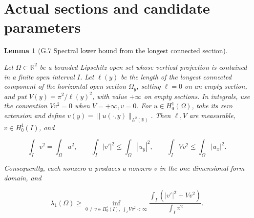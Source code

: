 \documentclass[11pt,a4paper]{article}
\theoremstyle{proofmanuscript}
\newtheorem{lemma}[theorem]{Lemma}
\begin{document}
\section{Actual sections and candidate parameters}

\begin{lemma}[G.7 Spectral lower bound from the longest connected section]\label{lem-largest-section}

Let \(\Omega\subset\mathbb R^2\) be a bounded Lipschitz open set whose vertical projection is contained in a finite open interval \(I\). Let \(\ell(y)\) be the length of the longest connected component of the horizontal open section \(\Omega_y\), setting \(\ell=0\) on an empty section, and put \(V(y)=\pi^2/\ell(y)^2\), with value \(+\infty\) on empty sections. In integrals, use the convention \(Vv^2=0\) when \(V=+\infty,v=0\). For \(u\in H_0^1(\Omega)\), take its zero extension and define \(v(y)=\|u(\cdot,y)\|_{L^2(\mathbb R)}\). Then \(\ell,V\) are measurable, \(v\in H_0^1(I)\), and

\[
\int_I v^2=\int_\Omega u^2,\qquad
\int_I |v'|^2\le\int_\Omega |u_y|^2,\qquad
\int_I Vv^2\le\int_\Omega |u_x|^2.
\]

Consequently, each nonzero \(u\) produces a nonzero \(v\) in the one-dimensional form domain, and

\[
\lambda_1(\Omega)\ge\inf_{0\ne v\in H_0^1(I),\ \int_I Vv^2<\infty}
\frac{\int_I(|v'|^2+Vv^2)}{\int_Iv^2}.\tag{G.7.4}
\]

\end{lemma}
\end{document}
